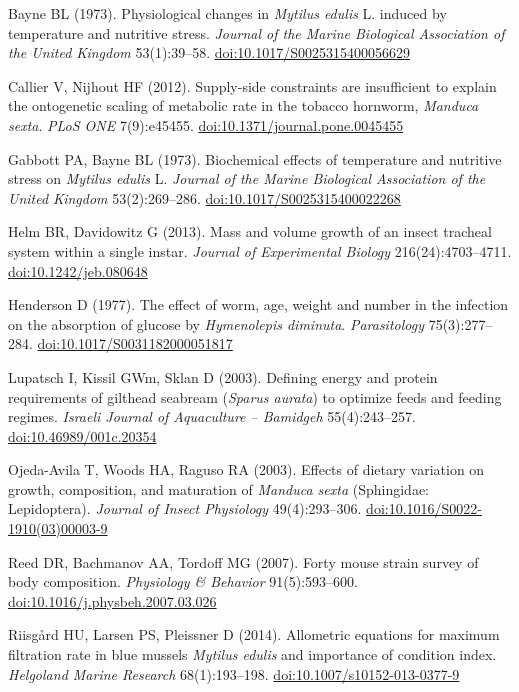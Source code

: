 \item Bayne BL (1973). Physiological changes in \emph{Mytilus edulis} L. induced by temperature and nutritive stress. \emph{Journal of the Marine Biological Association of the United Kingdom} 53(1):39–58. \href{https://doi.org/10.1017/S0025315400056629}{doi:10.1017/S0025315400056629}
\item Callier V, Nijhout HF (2012). Supply-side constraints are insufficient to explain the ontogenetic scaling of metabolic rate in the tobacco hornworm, \emph{Manduca sexta}. \emph{PLoS ONE} 7(9):e45455. \href{https://doi.org/10.1371/journal.pone.0045455}{doi:10.1371/journal.pone.0045455}
\item Gabbott PA, Bayne BL (1973). Biochemical effects of temperature and nutritive stress on \emph{Mytilus edulis} L. \emph{Journal of the Marine Biological Association of the United Kingdom} 53(2):269–286. \href{https://doi.org/10.1017/S0025315400022268}{doi:10.1017/S0025315400022268}
\item Helm BR, Davidowitz G (2013). Mass and volume growth of an insect tracheal system within a single instar. \emph{Journal of Experimental Biology} 216(24):4703–4711. \href{https://doi.org/10.1242/jeb.080648}{doi:10.1242/jeb.080648}
\item Henderson D (1977). The effect of worm, age, weight and number in the infection on the absorption of glucose by \emph{Hymenolepis diminuta}. \emph{Parasitology} 75(3):277–284. \href{https://doi.org/10.1017/S0031182000051817}{doi:10.1017/S0031182000051817}
\item Lupatsch I, Kissil GWm, Sklan D (2003). Defining energy and protein requirements of gilthead seabream (\emph{Sparus aurata}) to optimize feeds and feeding regimes. \emph{Israeli Journal of Aquaculture – Bamidgeh} 55(4):243–257. \href{https://doi.org/10.46989/001c.20354}{doi:10.46989/001c.20354}
\item Ojeda-Avila T, Woods HA, Raguso RA (2003). Effects of dietary variation on growth, composition, and maturation of \emph{Manduca sexta} (Sphingidae: Lepidoptera). \emph{Journal of Insect Physiology} 49(4):293–306. \href{https://doi.org/10.1016/S0022-1910(03)00003-9}{doi:10.1016/S0022-1910(03)00003-9}
\item Reed DR, Bachmanov AA, Tordoff MG (2007). Forty mouse strain survey of body composition. \emph{Physiology \& Behavior} 91(5):593–600. \href{https://doi.org/10.1016/j.physbeh.2007.03.026}{doi:10.1016/j.physbeh.2007.03.026}
\item Riisgård HU, Larsen PS, Pleissner D (2014). Allometric equations for maximum filtration rate in blue mussels \emph{Mytilus edulis} and importance of condition index. \emph{Helgoland Marine Research} 68(1):193–198. \href{https://doi.org/10.1007/s10152-013-0377-9}{doi:10.1007/s10152-013-0377-9}

